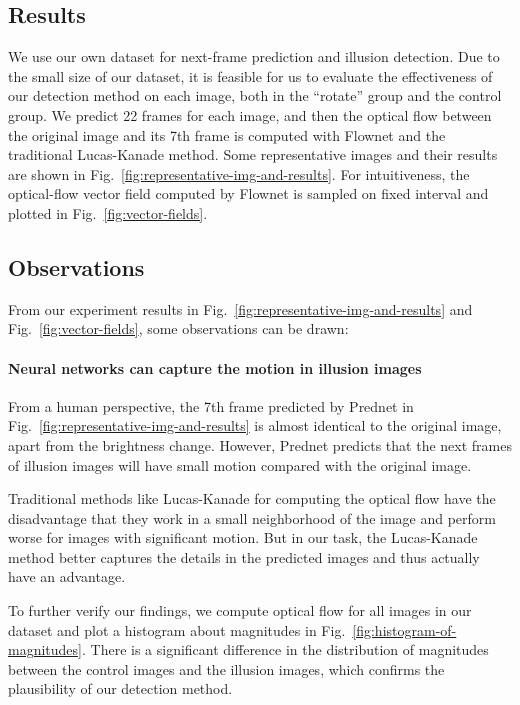 \documentclass[journal]{IEEEtran}
\begin{document}
\subsection{Results}

We use our own dataset for next-frame prediction and illusion detection. Due to the small size of our dataset, it is feasible for us to evaluate the effectiveness of our detection method on each image, both in the ``rotate'' group and the control group. We predict 22 frames for each image, and then the optical flow between the original image and its 7th frame is computed with Flownet and the traditional Lucas-Kanade method. Some representative images and their results are shown in Fig.~\ref{fig:representative-img-and-results}. For intuitiveness, the optical-flow vector field computed by Flownet is sampled on fixed interval and plotted in Fig.~\ref{fig:vector-fields}.

\subsection{Observations}

From our experiment results in Fig.~\ref{fig:representative-img-and-results} and Fig.~\ref{fig:vector-fields}, some observations can be drawn:

\paragraph{Neural networks can capture the motion in illusion images} From a human perspective, the 7th frame predicted by Prednet in Fig.~\ref{fig:representative-img-and-results} is almost identical to the original image, apart from the brightness change. However, Prednet predicts that the next frames of illusion images will have small motion compared with the original image.

Traditional methods like Lucas-Kanade for computing the optical flow have the disadvantage that they work in a small neighborhood of the image and perform worse for images with significant motion. But in our task, the Lucas-Kanade method better captures the details in the predicted images and thus actually have an advantage.

To further verify our findings, we compute optical flow for all images in our dataset and plot a histogram about magnitudes in Fig.~\ref{fig:histogram-of-magnitudes}. There is a significant difference in the distribution of magnitudes between the control images and the illusion images, which confirms the plausibility of our detection method.
\end{document}
